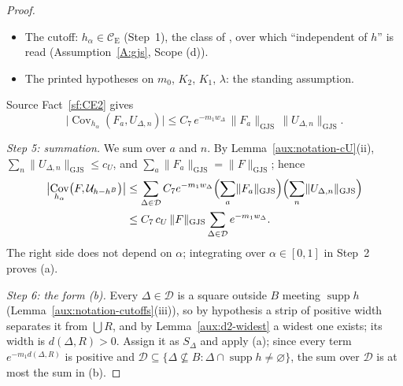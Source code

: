\documentclass[11pt,a4paper]{article}
\theoremstyle{plain}
\theoremstyle{definition}
\theoremstyle{plain}
\theoremstyle{definition}
\newcommand{\CE}{\mathcal{C}_{\mathrm E}}
\DeclareMathOperator{\supp}{supp}
\DeclareMathOperator{\Cov}{Cov}
\newcommand{\GJS}[1]{\lVert #1\rVert_{\mathrm{GJS}}}   %
\newcommand{\Uc}{\mathcal U}
\begin{document}
\begin{proof}
\begin{itemize}
  squares of $F_a$, which lie in $\bigcup R$; its width is $w_\Delta>0$ and its orientation is the
  one assigned.  Its two closed half-planes are disjoint because $w_\Delta>0$
  (Definition~\ref{aux:notation-stripdef}), so the localization squares of $F_a$ and $\Delta$ are
  disjoint, even as closed squares.  If $S_\Delta$ is transverse and $F_a$ is of type (1.1.5),
  this is the transverse case A8(iv)-T (Assumption~\ref{A:gjs}, item (iv-T)).
\item The cutoff: $h_\alpha\in\CE$ (Step~1), the class of \cite[p.~589]{GJS}, over which
  ``independent of $h$'' is read (Assumption~\ref{A:gjs}, Scope (d)).
\item The printed hypotheses on $m_0$, $K_2$, $K_1$, $\lambda$: the standing assumption.
\end{itemize}
Source Fact~\ref{sf:CE2} gives
\[
 \bigl|\Cov_{h_\alpha}(F_a,U_{\Delta,n})\bigr|\le C_7\,e^{-m_1w_\Delta}\,
 \GJS{F_a}\,\GJS{U_{\Delta,n}} .
\]

\emph{Step 5: summation.}  We sum over $a$ and $n$.  By Lemma~\ref{aux:notation-cU}(ii),
$\sum_n\GJS{U_{\Delta,n}}\le c_U$, and $\sum_a\GJS{F_a}=\GJS{F}$; hence
\begin{align*}
 \bigl|\Cov_{h_\alpha}\bigl(F,\Uc_{h-h^B}\bigr)\bigr|
 &\le\sum_{\Delta\in\mathcal D}C_7e^{-m_1w_\Delta}
   \Bigl(\sum_a\GJS{F_a}\Bigr)\Bigl(\sum_n\GJS{U_{\Delta,n}}\Bigr)\\
 &\le C_7\,c_U\,\GJS{F}\sum_{\Delta\in\mathcal D}e^{-m_1w_\Delta} .
\end{align*}
The right side does not depend on $\alpha$; integrating over $\alpha\in[0,1]$ in Step~2 proves
(a).

\emph{Step 6: the form (b).}  Every $\Delta\in\mathcal D$ is a square outside $B$ meeting $\supp h$
(Lemma~\ref{aux:notation-cutoffs}(iii)), so by hypothesis a strip of positive width separates it
from $\bigcup R$, and by Lemma~\ref{aux:d2-widest} a widest one exists; its width is
$d(\Delta,R)>0$.  Assign it as $S_\Delta$ and apply (a); since every term
$e^{-m_1d(\Delta,R)}$ is positive and
$\mathcal D\subseteq\{\Delta\not\subseteq B:\Delta\cap\supp h\ne\varnothing\}$, the sum over
$\mathcal D$ is at most the sum in (b).
\end{proof}
\end{document}
